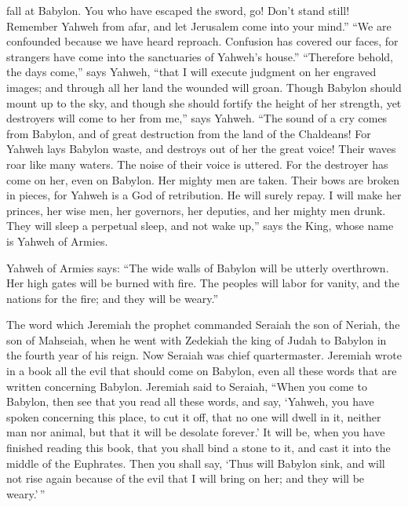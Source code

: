 fall at Babylon.  You who have escaped the sword, go!
Don't stand still! Remember Yahweh from afar, and let Jerusalem come
into your mind.''  ``We are confounded because we have
heard reproach. Confusion has covered our faces, for strangers have come
into the sanctuaries of Yahweh's house.''  ``Therefore
behold, the days come,'' says Yahweh, ``that I will execute judgment on
her engraved images; and through all her land the wounded will groan.
 Though Babylon should mount up to the sky, and though
she should fortify the height of her strength, yet destroyers will come
to her from me,'' says Yahweh.  ``The sound of a cry
comes from Babylon, and of great destruction from the land of the
Chaldeans!  For Yahweh lays Babylon waste, and destroys
out of her the great voice! Their waves roar like many waters. The noise
of their voice is uttered.  For the destroyer has come on
her, even on Babylon. Her mighty men are taken. Their bows are broken in
pieces, for Yahweh is a God of retribution. He will surely repay.
 I will make her princes, her wise men, her governors,
her deputies, and her mighty men drunk. They will sleep a perpetual
sleep, and not wake up,'' says the King, whose name is Yahweh of Armies.

 Yahweh of Armies says: ``The wide walls of Babylon will
be utterly overthrown. Her high gates will be burned with fire. The
peoples will labor for vanity, and the nations for the fire; and they
will be weary.''

 The word which Jeremiah the prophet commanded Seraiah
the son of Neriah, the son of Mahseiah, when he went with Zedekiah the
king of Judah to Babylon in the fourth year of his reign. Now Seraiah
was chief quartermaster.  Jeremiah wrote in a book all
the evil that should come on Babylon, even all these words that are
written concerning Babylon.  Jeremiah said to Seraiah,
``When you come to Babylon, then see that you read all these words,
 and say, `Yahweh, you have spoken concerning this place,
to cut it off, that no one will dwell in it, neither man nor animal, but
that it will be desolate forever.'  It will be, when you
have finished reading this book, that you shall bind a stone to it, and
cast it into the middle of the Euphrates.  Then you shall
say, `Thus will Babylon sink, and will not rise again because of the
evil that I will bring on her; and they will be weary.'\,''

